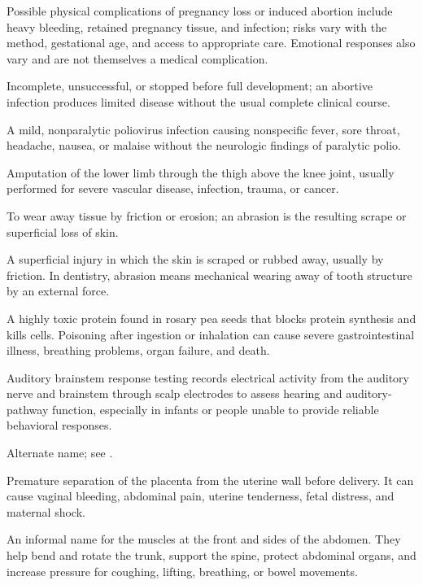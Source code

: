 Possible physical complications of pregnancy loss or induced abortion include heavy bleeding, retained pregnancy tissue, and infection; risks vary with the method, gestational age, and access to appropriate care. Emotional responses also vary and are not themselves a medical complication.

 Incomplete, unsuccessful, or stopped before full development; an abortive infection produces limited disease without the usual complete clinical course.

 A mild, nonparalytic poliovirus infection causing nonspecific fever, sore throat, headache, nausea, or malaise without the neurologic findings of paralytic polio.

 Amputation of the lower limb through the thigh above the knee joint, usually performed for severe vascular disease, infection, trauma, or cancer.

 To wear away tissue by friction or erosion; an abrasion is the resulting scrape or superficial loss of skin.

 A superficial injury in which the skin is scraped or rubbed away, usually by friction. In dentistry, abrasion means mechanical wearing away of tooth structure by an external force.

 A highly toxic protein found in rosary pea seeds that blocks protein synthesis and kills cells. Poisoning after ingestion or inhalation can cause severe gastrointestinal illness, breathing problems, organ failure, and death.

 Auditory brainstem response testing records electrical activity from the auditory nerve and brainstem through scalp electrodes to assess hearing and auditory-pathway function, especially in infants or people unable to provide reliable behavioral responses.

 Alternate name; see .

 Premature separation of the placenta from the uterine wall before delivery. It can cause vaginal bleeding,
abdominal pain, uterine tenderness, fetal distress, and maternal shock.

 An informal name for the muscles at the front and sides of the abdomen. They help bend and rotate the trunk, support the spine, protect abdominal organs, and increase pressure for coughing, lifting, breathing, or bowel movements.

